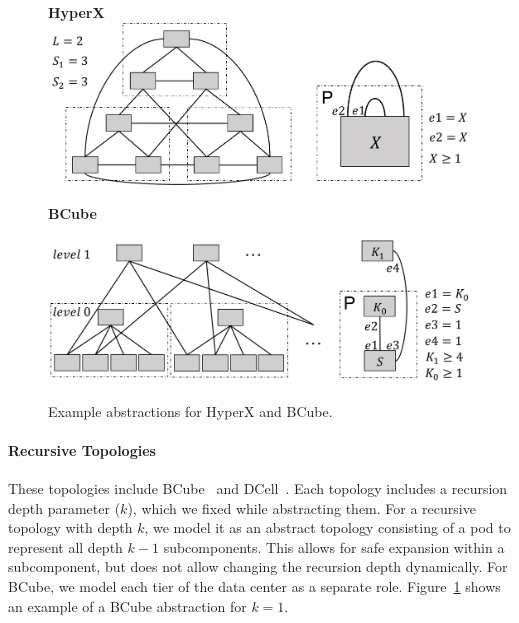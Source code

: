 \documentclass[numbers, 10pt]{sigplanconf}
\newcommand{\para}[1]{\paragraph*{\textbf{#1}}}
\newcommand{\hdr}[2]{\flushleft \chdr{\hspace{5mm}#1}{#2}}
\newcommand{\chdr}[2]{\textbf{#1} {#2} \\ \centering}%
\begin{document}
\begin{figure}[t!]
  \begin{minipage}[t]{\linewidth}
    \hdr{HyperX}{}
    \vspace{.6em}
    \includegraphics[width=\linewidth]{figures/hyperx}
  \end{minipage}%

  \vspace{1em}
  \begin{minipage}[t]{\linewidth}
    \hdr{BCube}{}
    \vspace{.1em}
    \includegraphics[width=\linewidth]{figures/bcube}
  \end{minipage}%


  \caption{Example abstractions for HyperX and BCube.}
  \label{fig:example-abstractions}
  \vspace{-.8em}%
\end{figure}


\para{Recursive Topologies}
These topologies include BCube~\cite{bcube} and DCell~\cite{dcell}. Each topology includes a recursion depth parameter ($k$), which we fixed while abstracting them. For a recursive topology with depth $k$, we model it as an abstract topology consisting of a pod to represent all depth $k-1$ subcomponents. This allows for safe expansion within a subcomponent, but does not allow changing the recursion depth dynamically.
For BCube, we model each tier of the data center as a separate role. Figure~\ref{fig:example-abstractions} shows an example of a BCube abstraction for $k=1$.
\end{document}
